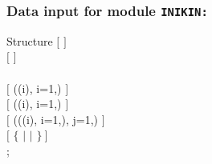 \vskip 0.2cm

\subsubsection{Data input for module {\tt INIKIN:}}\label{sect:inikin_data}

\begin{DataStructure}{Structure }
$[$   $]$ \\
$[$   $]$ \\
~  \\
$[$  ((i),    i=1,) $]$ \\
$[$  ((i),    i=1,) $]$ \\
$[$  (((i),    i=1,), j=1,) $]$ \\
$[$  $\{$  $|$  $|$   $\}~]$ \\
;
\end{DataStructure}

